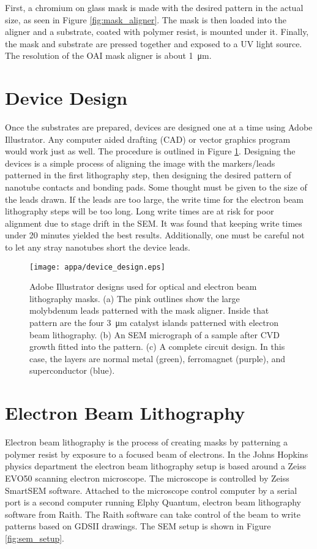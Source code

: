 First, a chromium on glass mask is made with the desired pattern in the actual size, as seen in Figure \ref{fig:mask_aligner}. The mask is then loaded into the aligner and a substrate, coated with polymer resist, is mounted under it. Finally, the mask and substrate are pressed together and exposed to a UV light source. The resolution of the OAI mask aligner is about \SI{1}{\micro\meter}.

\section{Device Design}
\label{sec:device_design}

Once the substrates are prepared, devices are designed one at a time using Adobe Illustrator. Any computer aided drafting (CAD) or vector graphics program would work just as well. The procedure is outlined in Figure \ref{fig:device_design}. Designing the devices is a simple process of aligning the image with the markers/leads patterned in the first lithography step, then designing the desired pattern of nanotube contacts and bonding pads. Some thought must be given to the size of the leads drawn. If the leads are too large, the write time for the electron beam lithography steps will be too long. Long write times are at risk for poor alignment due to stage drift in the SEM. It was found that keeping write times under 20 minutes yielded the best results. Additionally, one must be careful not to let any stray nanotubes short the device leads.

\begin{figure}
	\centering
	\texttt{[image: appa/device\_design.eps]}
	\caption{Adobe Illustrator designs used for optical and electron beam lithography masks. (a) The pink outlines show the large molybdenum leads patterned with the mask aligner. Inside that pattern are the four \SI{3}{\micro\meter} catalyst islands patterned with electron beam lithography. (b) An SEM micrograph of a sample after CVD growth fitted into the pattern. (c) A complete circuit design. In this case, the layers are normal metal (green), ferromagnet (purple), and superconductor (blue).} 
	\label{fig:device_design}
\end{figure}

\section{Electron Beam Lithography}
\label{sec:ebeam_lith}

Electron beam lithography is the process of creating masks by patterning a polymer resist by exposure to a focused beam of electrons. In the Johns Hopkins physics department the electron beam lithography setup is based around a Zeiss EVO50 scanning electron microscope. The microscope is controlled by Zeiss SmartSEM software. Attached to the microscope control computer by a serial port is a second computer running Elphy Quantum, electron beam lithography software from Raith. The Raith software can take control of the beam to write patterns based on GDSII drawings. The SEM setup is shown in Figure \ref{fig:sem_setup}.

